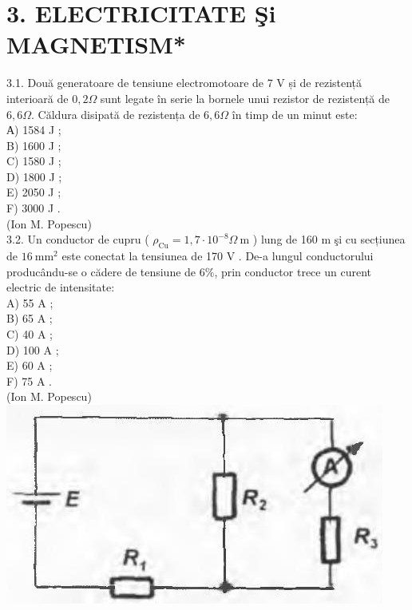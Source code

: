 \documentclass[10pt]{article}
\begin{document}
\section*{3. ELECTRICITATE Şi MAGNETISM*}
3.1. Două generatoare de tensiune electromotoare de 7 V și de rezistență interioară de $0,2 \Omega$ sunt legate în serie la bornele unui rezistor de rezistență de $6,6 \Omega$. Căldura disipată de rezistența de $6,6 \Omega$ în timp de un minut este:\\
А) 1584 J ;\\
B) 1600 J ;\\
C) 1580 J ;\\
D) 1800 J ;\\
E) 2050 J ;\\
F) 3000 J .\\
(Ion M. Popescu)\\
3.2. Un conductor de cupru ( $\rho_{\mathrm{Cu}}=1,7 \cdot 10^{-8} \Omega \mathrm{~m}$ ) lung de 160 m şi cu secțiunea de $16 \mathrm{~mm}^{2}$ este conectat la tensiunea de 170 V . De-a lungul conductorului producându-se o cădere de tensiune de $6 \%$, prin conductor trece un curent electric de intensitate:\\
A) 55 A ;\\
B) 65 A ;\\
C) 40 A ;\\
D) 100 A ;\\
E) 60 A ;\\
F) 75 A .\\
(Ion M. Popescu)\\
\includegraphics[max width=\textwidth, center]{2025_07_01_5b3ff9fa0d508c8e9f17g-144}
\end{document}
